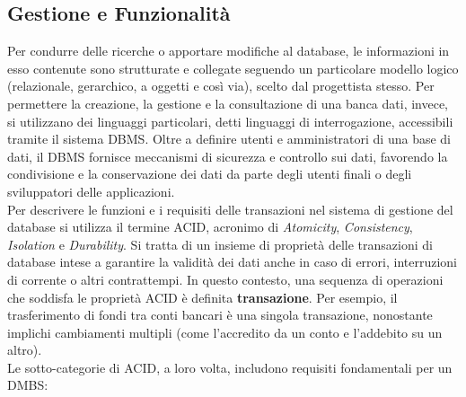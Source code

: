 \subsection{Gestione e Funzionalità}
Per condurre delle ricerche o apportare modifiche al database, le informazioni in esso contenute sono strutturate e collegate seguendo un particolare modello logico (relazionale, gerarchico, a oggetti e così via), scelto dal progettista stesso. Per permettere la creazione, la gestione e la consultazione di una banca dati, invece, si utilizzano dei linguaggi particolari, detti linguaggi di interrogazione, accessibili tramite il sistema DBMS. Oltre a definire utenti e amministratori di una base di dati, il DBMS fornisce meccanismi di sicurezza e controllo sui dati, favorendo la condivisione e la conservazione dei dati da parte degli utenti finali o degli sviluppatori delle applicazioni.\\
Per descrivere le funzioni e i requisiti delle transazioni nel sistema di gestione del database si utilizza il termine ACID, acronimo di \textit{Atomicity}, \textit{Consistency}, \textit{Isolation} e \textit{Durability}. Si tratta di un insieme di proprietà delle transazioni di database intese a garantire la validità dei dati anche in caso di errori, interruzioni di corrente o altri contrattempi. In questo contesto, una sequenza di operazioni che soddisfa le proprietà ACID è definita \textbf{transazione}.\cite{DATABASE_ionos} Per esempio, il trasferimento di fondi tra conti bancari è una singola transazione, nonostante implichi cambiamenti multipli (come l’accredito da un conto e l’addebito su un altro).\\
Le sotto-categorie di ACID, a loro volta, includono requisiti fondamentali per un DMBS:
